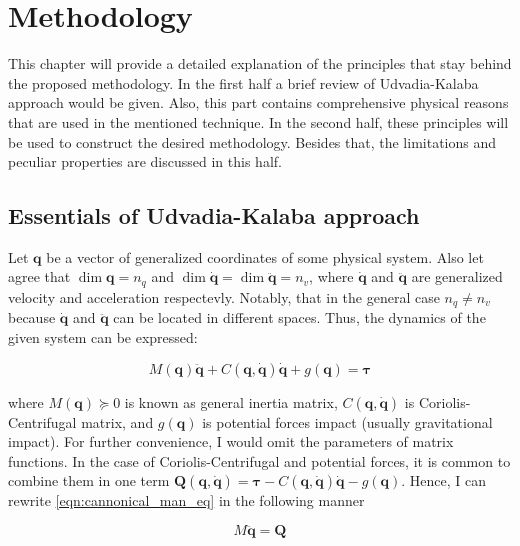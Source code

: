 \chapter{Methodology}
\label{chap:met}

This chapter will provide a detailed explanation of the principles that stay
behind the proposed methodology. In the first half a brief review of Udvadia-Kalaba
approach would be given. Also, this part contains comprehensive physical reasons
that are used in the mentioned technique. In the second half, these principles
will be used to construct the desired methodology. Besides that, the limitations 
and peculiar properties are discussed in this half.

\section{Essentials of Udvadia-Kalaba approach}

Let $\mathbf{q}$ be a vector of generalized coordinates of some physical system.
Also let agree that $\dim \mathbf{q} = n_q$ and 
$\dim \dot{\mathbf{q}} = \dim \ddot{\mathbf{q}} = n_v$, where $\dot{\mathbf{q}}$ and 
$\ddot{\mathbf{q}}$ are generalized velocity and acceleration respectevly. Notably, 
that in the general case $n_q \neq n_v$ because $\dot{\mathbf{q}}$ and $\ddot{\mathbf{q}}$ 
can be located in different spaces. Thus, the dynamics of the given system can be 
expressed:

\begin{equation}
    \label{eqn:cannonical_man_eq}
    M(\mathbf{q}) \ddot{\mathbf{q}} 
    + C(\mathbf{q}, \dot{\mathbf{q}}) \dot{\mathbf{q}} 
    + g(\mathbf{q}) = \boldsymbol{\tau}
\end{equation}

where $M(\mathbf{q}) \succeq 0 $ is known as general inertia matrix, 
$C(\mathbf{q}, \dot{\mathbf{q}})$ is Coriolis-Centrifugal matrix, and 
$g(\mathbf{q})$ is potential forces impact (usually gravitational impact). 
For further convenience, I would omit the parameters of matrix functions. 
In the case of Coriolis-Centrifugal and potential forces, it is common to 
combine them in one term $\mathbf{Q}(\mathbf{q}, \dot{\mathbf{q}}) = \boldsymbol{\tau}
- C(\mathbf{q}, \dot{\mathbf{q}}) \dot{\mathbf{q}} - g(\mathbf{q})$. Hence, I can 
rewrite \ref{eqn:cannonical_man_eq} in the following manner

\begin{equation}
    \label{eqn:compact_man_eq}
    M \ddot{\mathbf{q}} = \mathbf{Q}
\end{equation}

